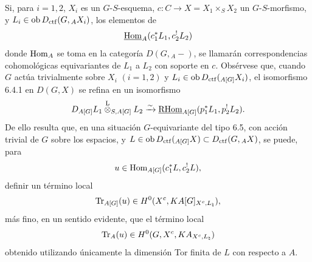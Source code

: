 Si, para $i=1,2$, $X_i$ es un $G$-$S$-esquema, $c:C\to X=X_1\times_SX_2$ un $G$-$S$-morfismo, y $L_i\in\operatorname{ob} D_{\mathrm{ctf}}(G,{}_AX_i)$, los elementos de
\[
\underline{\operatorname{Hom}}_A(c_1^*L_1,c_2^!L_2)
\]
donde $\operatorname{Hom}_A$ se toma en la categoría $D(G,{}_A-)$, se llamarán correspondencias cohomológicas equivariantes de $L_1$ a $L_2$ con soporte en $c$. Obsérvese que, cuando $G$ actúa trivialmente sobre $X_i$ $(i=1,2)$ y $L_i\in\operatorname{ob} D_{\mathrm{ctf}}({}_{A[G]}X_i)$, el isomorfismo 6.4.1 en $D(G,X)$ se refina en un isomorfismo
\[
D_{A[G]}L_1\overset{\mathrm L}{\otimes}_{S,A[G]}L_2
\xrightarrow{\sim}
\underline{\mathrm{RHom}}_{A[G]}(p_1^*L_1,p_2^!L_2).
\]
De ello resulta que, en una situación $G$-equivariante del tipo 6.5, con acción trivial de $G$ sobre los espacios, y $L\in\operatorname{ob} D_{\mathrm{ctf}}({}_{A[G]}X)\subset D_{\mathrm{ctf}}(G,{}_AX)$, se puede, para
\[
u\in\operatorname{Hom}_{A[G]}(c_1^*L,c_2^!L),
\]
definir un término local
\[
\operatorname{Tr}_{A[G]}(u)\in H^0(X^c,KA[G]_{X^c,L_{\natural}}),
\]
más fino, en un sentido evidente, que el término local
\[
\operatorname{Tr}_A(u)\in H^0(G,X^c,KA_{X^c,L_{\natural}})
\]
obtenido utilizando únicamente la dimensión Tor finita de $L$ con respecto a $A$.
